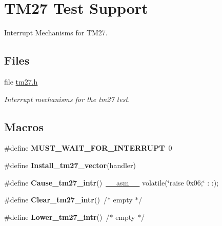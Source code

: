 \hypertarget{group__ezkit533__tm27}{}\section{T\+M27 Test Support}
\label{group__ezkit533__tm27}


Interrupt Mechanisms for T\+M27.  


\subsection*{Files}
\begin{DoxyCompactItemize}
\item 
file \mbox{\hyperlink{bfin_2eZKit533_2include_2tm27_8h}{tm27.\+h}}
\begin{DoxyCompactList}\small\item\em Interrupt mechanisms for the tm27 test. \end{DoxyCompactList}\end{DoxyCompactItemize}
\subsection*{Macros}
\begin{DoxyCompactItemize}
\item 
\mbox{\label{group__ezkit533__tm27_ga00a44436eb28b5b03d1cba2dcdf7382f}} 
\#define {\bfseries M\+U\+S\+T\+\_\+\+W\+A\+I\+T\+\_\+\+F\+O\+R\+\_\+\+I\+N\+T\+E\+R\+R\+U\+PT}~0
\item 
\#define {\bfseries Install\+\_\+tm27\+\_\+vector}(handler)
\item 
\mbox{\label{group__ezkit533__tm27_ga31c3068f1561630ef247cc984a25990b}} 
\#define {\bfseries Cause\+\_\+tm27\+\_\+intr}()~\mbox{\hyperlink{group__RTEMSScoreCPUSPARC_ga82257d4fc068f4b21b029dd69d276839}{\+\_\+\+\_\+asm\+\_\+\+\_\+}} volatile(\char`\"{}raise 0x06;\char`\"{} \+: \+:);
\item 
\mbox{\label{group__ezkit533__tm27_ga3eab10f81fe142df22f52661408b5513}} 
\#define {\bfseries Clear\+\_\+tm27\+\_\+intr}()~/$\ast$ empty $\ast$/
\item 
\mbox{\label{group__ezkit533__tm27_gabe0ac599b1a9198602fa3bab0ddc7576}} 
\#define {\bfseries Lower\+\_\+tm27\+\_\+intr}()~/$\ast$ empty $\ast$/
\end{DoxyCompactItemize}


